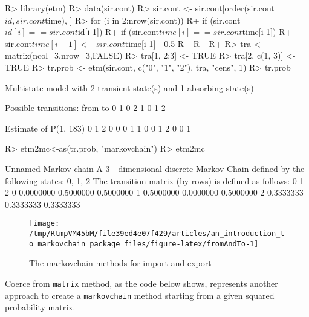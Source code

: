 \documentclass[
  nojss]{jss}
\begin{document}
\begin{CodeChunk}

\begin{CodeInput}
R> library(etm)
R> data(sir.cont)
R> sir.cont <- sir.cont[order(sir.cont$id, sir.cont$time), ]
R> for (i in 2:nrow(sir.cont)) {
R+   if (sir.cont$id[i]==sir.cont$id[i-1]) {
R+     if (sir.cont$time[i]==sir.cont$time[i-1]) {
R+       sir.cont$time[i-1] <- sir.cont$time[i-1] - 0.5
R+     }
R+   }
R+ }
R> tra <- matrix(ncol=3,nrow=3,FALSE)
R> tra[1, 2:3] <- TRUE
R> tra[2, c(1, 3)] <- TRUE
R> tr.prob <- etm(sir.cont, c("0", "1", "2"), tra, "cens", 1)
R> tr.prob
\end{CodeInput}

\begin{CodeOutput}
Multistate model with 2 transient state(s)
 and 1 absorbing state(s)

Possible transitions:
 from to
    0  1
    0  2
    1  0
    1  2

Estimate of P(1, 183)
  0 1 2
0 0 0 1
1 0 0 1
2 0 0 1
\end{CodeOutput}

\begin{CodeInput}
R> etm2mc<-as(tr.prob, "markovchain")
R> etm2mc
\end{CodeInput}

\begin{CodeOutput}
Unnamed Markov chain 
 A  3 - dimensional discrete Markov Chain defined by the following states: 
 0, 1, 2 
 The transition matrix  (by rows)  is defined as follows: 
          0         1         2
0 0.0000000 0.5000000 0.5000000
1 0.5000000 0.0000000 0.5000000
2 0.3333333 0.3333333 0.3333333
\end{CodeOutput}
\end{CodeChunk}

\begin{CodeChunk}
\begin{figure}

{\centering \texttt{[image: /tmp/RtmpVM45bM/file39ed4e07f429/articles/an\_introduction\_to\_markovchain\_package\_files/figure-latex/fromAndTo-1]} 

}

\caption[The markovchain methods for import and export]{The markovchain methods for import and export}\label{fig:fromAndTo}
\end{figure}
\end{CodeChunk}

Coerce from \texttt{matrix} method, as the code below shows, represents another approach to create a \texttt{markovchain} method starting from a given squared probability matrix.
\end{document}
